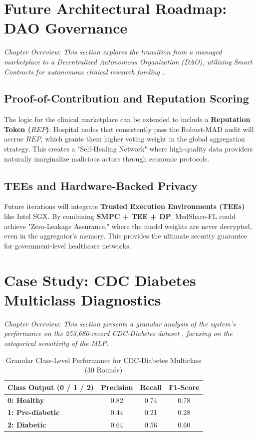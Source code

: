 \documentclass[10pt, a4paper, twocolumn]{article}
\begin{document}
\section{Future Architectural Roadmap: DAO Governance}

\textit{Chapter Overview: This section explores the transition from a managed marketplace to a Decentralized Autonomous Organization (DAO), utilizing Smart Contracts for autonomous clinical research funding \cite{kairouz2021}.}

\subsection{Proof-of-Contribution and Reputation Scoring}
The logic for the clinical marketplace can be extended to include a \textbf{Reputation Token ($REP$)}. Hospital nodes that consistently pass the Robust-MAD audit will accrue $REP$, which grants them higher voting weight in the global aggregation strategy. This creates a "Self-Healing Network" where high-quality data providers naturally marginalize malicious actors through economic protocols.

\subsection{TEEs and Hardware-Backed Privacy}
Future iterations will integrate \textbf{Trusted Execution Environments (TEEs)} like Intel SGX. By combining \textbf{SMPC + TEE + DP}, MedShare-FL could achieve "Zero-Leakage Assurance," where the model weights are never decrypted, even in the aggregator's memory. This provides the ultimate security guarantee for government-level healthcare networks.

\section{Case Study: CDC Diabetes Multiclass Diagnostics}

\textit{Chapter Overview: This section presents a granular analysis of the system's performance on the 253,680-record CDC-Diabetes dataset \cite{cdc2015}, focusing on the categorical sensitivity of the MLP.}

\begin{table}[hbt!]
\centering
\scriptsize
\begin{tabular}{lccc}
\toprule
\textbf{Class Output (0 / 1 / 2)} & \textbf{Precision} & \textbf{Recall} & \textbf{F1-Score} \\
\midrule
\textbf{0: Healthy} & 0.82 & 0.74 & 0.78 \\
\textbf{1: Pre-diabetic} & 0.44 & 0.21 & 0.28 \\
\textbf{2: Diabetic} & 0.64 & 0.56 & 0.60 \\
\bottomrule
\end{tabular}
\caption{Granular Class-Level Performance for CDC-Diabetes Multiclass (30 Rounds)}
\end{table}
\end{document}
